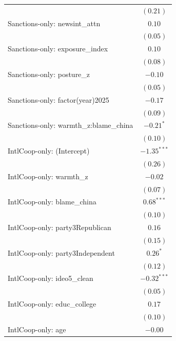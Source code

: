 \begin{tabular}{l c}
                                           & $(0.21)$      \\
Sanctions-only: newsint\_attn              & $0.10$        \\
                                           & $(0.05)$      \\
Sanctions-only: exposure\_index            & $0.10$        \\
                                           & $(0.08)$      \\
Sanctions-only: posture\_z                 & $-0.10$       \\
                                           & $(0.05)$      \\
Sanctions-only: factor(year)2025           & $-0.17$       \\
                                           & $(0.09)$      \\
Sanctions-only: warmth\_z:blame\_china     & $-0.21^{*}$   \\
                                           & $(0.10)$      \\
IntlCoop-only: (Intercept)                 & $-1.35^{***}$ \\
                                           & $(0.26)$      \\
IntlCoop-only: warmth\_z                   & $-0.02$       \\
                                           & $(0.07)$      \\
IntlCoop-only: blame\_china                & $0.68^{***}$  \\
                                           & $(0.10)$      \\
IntlCoop-only: party3Republican            & $0.16$        \\
                                           & $(0.15)$      \\
IntlCoop-only: party3Independent           & $0.26^{*}$    \\
                                           & $(0.12)$      \\
IntlCoop-only: ideo5\_clean                & $-0.32^{***}$ \\
                                           & $(0.05)$      \\
IntlCoop-only: educ\_college               & $0.17$        \\
                                           & $(0.10)$      \\
IntlCoop-only: age                         & $-0.00$       \\

\end{tabular}
